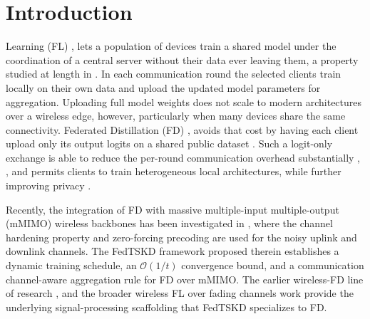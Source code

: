 \documentclass[journal]{IEEEtran}
\newcommand{\rev}[1]{#1}
\begin{document}
{\renewcommand{\abstractname}{Impact Statement}
\begin{abstract}
\rev{Wireless networks are starting to train shared artificial intelligence models across phones, wearables and vehicles. The data never leaves the device. Only a handful of devices can be served in each training round. Picking them at random means some devices contribute far more than others. Whose data shapes the model then becomes partly a matter of chance. This work replaces that lottery with a rotation. Its fairness follows from three quantities a network operator already knows. It can therefore be stated before a deployment is switched on rather than measured after it has run. Operators give up no accuracy in exchange. Artificial intelligence systems face a growing legal duty to evidence fair treatment of the people they serve. Committing to a participation guarantee in advance, rather than reporting one in hindsight, changes what a deployment can promise its users and its regulators.}
\end{abstract}}
\vspace{-1em}
\section{Introduction}
\label{sec:introduction}
 Learning (FL) \cite{mcmahan2017communication}, \cite{borazjani2026redefining} lets a population of devices train a shared model under the coordination of a central server without their data ever leaving them, a property studied at length in \cite{rao2025privacy, lim2020federated, huang2024survey, lu2024noniid}. In each communication round the selected clients train locally on their own data and upload the updated model parameters for aggregation. Uploading full model weights does not scale to modern architectures over a wireless edge, however, particularly when many devices share the same connectivity. Federated Distillation (FD) \cite{jeong2018communication}, \cite{xing2022efficient} avoids that cost by having each client upload only its output logits on a shared public dataset \cite{itahara2023distillation}. Such a logit-only exchange is able to reduce the per-round communication overhead substantially \cite{sattler2022cfd}, \cite{sattler2023fedaux}, and permits clients to train heterogeneous local architectures, while further improving privacy \cite{chan2021fedhe, cho2023clustered, wu2024fedict}.

Recently, the integration of FD with massive multiple-input multiple-output (mMIMO) wireless backbones has been investigated in \cite{mu2024fedtskd}, where the channel hardening property and zero-forcing precoding are used for the noisy uplink and downlink channels. The FedTSKD framework proposed therein establishes a dynamic training schedule, an $\mathcal{O}(1/t)$ convergence bound, and a communication channel-aware aggregation rule for FD over mMIMO. The earlier wireless-FD line of research \cite{ahn2019wireless}, \cite{ahn2020cooperative} and the broader wireless FL over fading channels work \cite{amiri2020federated, amiri2020machine, vu2020cell, amiri2021convergence} provide the underlying signal-processing scaffolding that FedTSKD specializes to FD.
\end{document}

